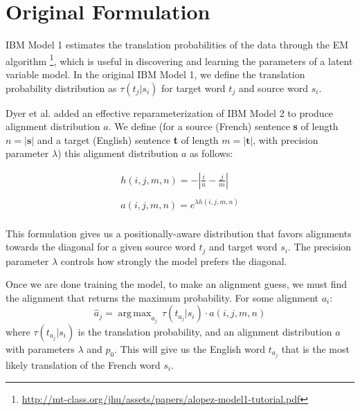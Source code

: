\documentclass[twoside,twocolumn]{article}
\DeclareMathOperator*{\argmax}{arg\,max}
\begin{document}




\section{Original Formulation}
\label{sec:original-formulation}

IBM Model 1 estimates the translation probabilities of the data through the EM
algorithm
\footnote{\url{http://mt-class.org/jhu/assets/papers/alopez-model1-tutorial.pdf}},
which is useful in discovering and learning the parameters of a
latent variable model.
In the original IBM Model 1, we define the translation probability distribution
as $\tau(t_j|s_i)$ for target word $t_j$ and source word $s_i$.

Dyer et al. \cite{dyer2013simple} added an effective reparameterization
of IBM Model 2 to produce alignment distribution $a$. We define (for a source
(French) sentence \textbf{s} of length $n = |\textbf{s}|$ and a target (English)
sentence \textbf{t} of length $m = |\textbf{t}|$, with precision parameter
$\lambda$) this alignment distribution $a$ as follows:

\begin{equation}
\begin{split}
h(i,j,m,n) = - \left| \frac{i}{n} - \frac{j}{m}\right| \\
\\
a(i,j,m,n) =e^{  \lambda h(i,j,m,n)} \\
\end{split}
\end{equation}

This formulation gives us a positionally-aware distribution that favors alignments
towards the diagonal for a given source word $t_j$ and target word $s_i$. The
precision parameter $\lambda$ controls how strongly the model prefers the
diagonal.

Once we are done training the model, to make an alignment guess, we must find
the alignment that returns the maximum probability. For some alignment $a_i$:
\begin{equation}
\hat{a}_j = \argmax_{a_j} \, \tau(t_{a_j}|s_i) \cdot a(i, j, m, n)
\end{equation}
where $\tau(t_{a_j}|s_i)$ is the translation probability, and an alignment
distribution $a$ with parameters $\lambda$ and $p_0$. This will give us the
English word $t_{a_j}$ that is the most likely translation of the French word
$s_i$.
\end{document}

